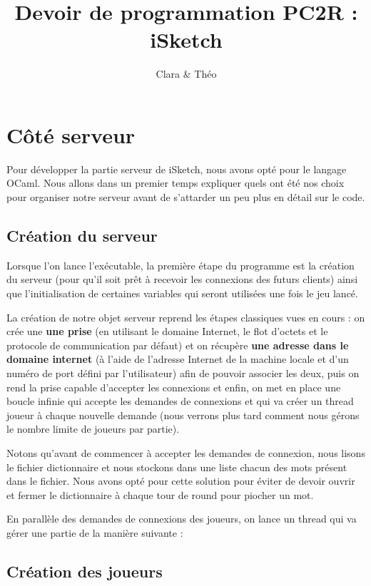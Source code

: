 \documentclass[a4paper, 11pt]{article}
\title{Devoir de programmation PC2R : iSketch}
\author{Clara \bsc{Muller} \& Théo \bsc{Lebourg}}
\date{}
\begin{document}
\maketitle

\section{Côté serveur}
Pour développer la partie serveur de iSketch, nous avons opté pour le
langage OCaml. Nous allons dans un premier temps expliquer quels ont
été nos choix pour organiser notre serveur avant de s’attarder un peu
plus en détail sur le code.

\subsection {Création du serveur}
Lorsque l'on lance l’exécutable, la première étape du programme est la
création du serveur (pour qu’il soit prêt à recevoir les connexions
des futurs clients) ainsi que l’initialisation de certaines variables
qui seront utilisées une fois le jeu lancé.

\bigskip La création de notre objet serveur reprend les étapes
classiques vues en cours : on crée une \textbf{une prise} (en
utilisant le domaine Internet, le flot d’octets et le protocole de
communication par défaut) et on récupère \textbf{une adresse dans le
  domaine internet} (à l’aide de l’adresse Internet de la machine
locale et d’un numéro de port défini par l’utilisateur) afin de
pouvoir associer les deux, puis on rend la prise capable d’accepter
les connexions et enfin, on met en place une boucle infinie qui
accepte les demandes de connexions et qui va créer un thread joueur à
chaque nouvelle demande (nous verrons plus tard comment nous gérons le
nombre limite de joueurs par partie).

Notons qu’avant de commencer à accepter les demandes de connexion,
nous lisons le fichier dictionnaire et nous stockons dans une liste
chacun des mots présent dans le fichier. Nous avons opté pour cette
solution pour éviter de devoir ouvrir et fermer le dictionnaire à
chaque tour de round pour piocher un mot. 

\bigskip En parallèle des demandes de connexions des joueurs, on lance
un thread qui va gérer une partie de la manière suivante :
\bigskip

\subsection {Création des joueurs}
\end{document}
